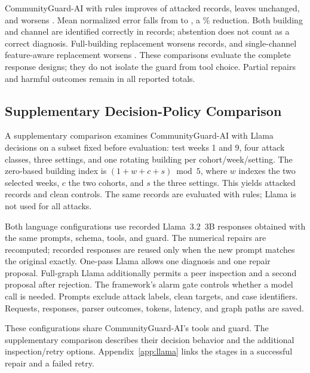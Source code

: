 \documentclass[conference]{IEEEtran}
\begin{document}


CommunityGuard-AI with rules improves \ImproveN{} of \CaseN{} attacked records, leaves \UnchangedN{} unchanged, and worsens \HarmN{}. Mean normalized error falls from \BeforeE{} to \AfterE{}, a \ErrorReduction{}\% reduction. Both building and channel are identified correctly in \JointN{} records; abstention does not count as a correct diagnosis. Full-building replacement worsens \OriginalHarm{} records, and single-channel feature-aware replacement worsens \TypedHarm{}. These comparisons evaluate the complete response designs; they do not isolate the guard from tool choice. Partial repairs and harmful outcomes remain in all reported totals.





\subsection{Supplementary Decision-Policy Comparison}

A supplementary comparison examines CommunityGuard-AI with Llama decisions on a subset fixed before evaluation: test weeks 1 and 9, four attack classes, three settings, and one rotating building per cohort/week/setting. The zero-based building index is $(1+w+c+s)\bmod5$, where $w$ indexes the two selected weeks, $c$ the two cohorts, and $s$ the three settings. This yields \PairedCaseN{} attacked records and \PairedCleanN{} clean controls. The same records are evaluated with rules; Llama is not used for all \CaseN{} attacks.

Both language configurations use recorded Llama~3.2~3B responses obtained with the same prompts, schema, tools, and guard. The numerical repairs are recomputed; recorded responses are reused only when the new prompt matches the original exactly. One-pass Llama allows one diagnosis and one repair proposal. Full-graph Llama additionally permits a peer inspection and a second proposal after rejection. The framework's alarm gate controls whether a model call is needed. Prompts exclude attack labels, clean targets, and case identifiers. Requests, responses, parser outcomes, tokens, latency, and graph paths are saved.





These configurations share CommunityGuard-AI's tools and guard. The supplementary comparison describes their decision behavior and the additional inspection/retry options. Appendix~\ref{app:llama} links the stages in a successful repair and a failed retry.
\end{document}
